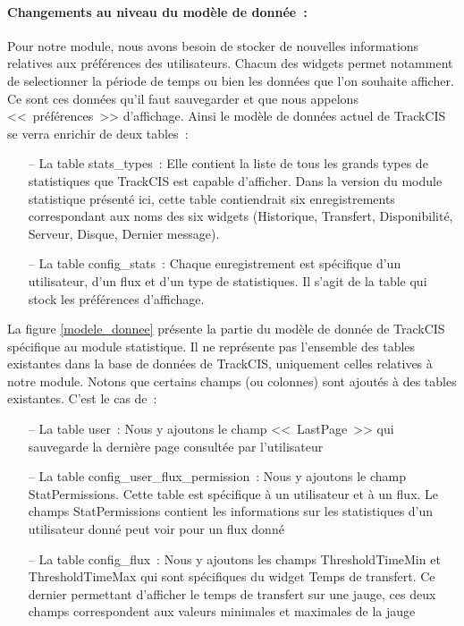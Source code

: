 			\paragraph{Changements au niveau du modèle de donnée~:}
			Pour notre module, nous avons besoin de stocker de nouvelles informations
			relatives aux préférences des utilisateurs. Chacun des widgets permet
			notamment de selectionner la période de temps ou bien les données que l'on
			souhaite afficher. Ce sont ces données qu'il faut sauvegarder et que nous
			appelons <<~préférences~>> d'affichage.
			Ainsi le modèle de données actuel de TrackCIS se verra enrichir de deux
			tables~:
			\begin{itemize}
			  \item[-- La table stats\_types~:] Elle contient la liste de tous les
			  grands types de statistiques que TrackCIS est capable d'afficher. Dans la
			  version du module statistique présenté ici, cette table contiendrait
			  six enregistrements correspondant aux noms des six widgets (Historique,
			  Transfert, Disponibilité, Serveur, Disque, Dernier message).
			  \item[-- La table config\_stats~:] Chaque enregistrement est
			  spécifique d'un utilisateur, d'un flux et d'un type de statistiques. Il
			  s'agit de la table qui stock les préférences d'affichage.
			\end{itemize}
			La figure \ref{modele_donnee} présente la partie du modèle de donnée de
			TrackCIS spécifique au module statistique. Il ne représente pas
			l'ensemble des tables existantes dans la base de données de TrackCIS,
			uniquement celles relatives à notre module. Notons que certains champs (ou
			colonnes) sont ajoutés à des tables existantes. C'est le cas de~:
			\begin{itemize}
			  \item[-- La table user~:] Nous y ajoutons le champ <<~LastPage~>> qui
			  sauvegarde la dernière page consultée par l'utilisateur
			  \item[-- La table config\_user\_flux\_permission~:] Nous y ajoutons le
			  champ StatPermissions. Cette table est spécifique à un utilisateur et à un flux.
			  Le champs StatPermissions contient les informations sur les statistiques
			  d'un utilisateur donné peut voir pour un flux donné
			  \item[-- La table config\_flux~:] Nous y ajoutons les champs
			  ThresholdTimeMin et ThresholdTimeMax qui sont spécifiques du widget Temps
			  de transfert.
			  Ce dernier permettant d'afficher le temps de transfert sur une jauge, ces
			  deux champs correspondent aux valeurs minimales et maximales de la jauge
			\end{itemize}
